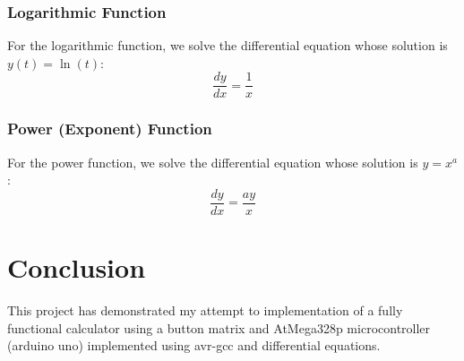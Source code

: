 \documentclass[a4paper,12pt]{article}
\begin{document}
\subsubsection*{Logarithmic Function}

For the logarithmic function, we solve the differential equation whose solution is \( y(t) = \ln(t) \):
\[
\frac{dy}{dx} = \frac{1}{x}
\]

\subsubsection*{Power (Exponent) Function}

For the power function, we solve the differential equation whose solution is $y = x^a$:
\[
\frac{dy}{dx} = \frac{ay}{x}
\]



\section*{Conclusion}
This project has demonstrated my attempt to implementation of a fully functional calculator using a button matrix and AtMega328p microcontroller (arduino uno) implemented using avr-gcc and differential equations. 
\end{document}
